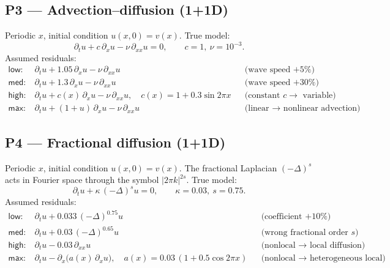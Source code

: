 \documentclass[11pt]{article}
\newcommand{\lap}{\Delta}
\newcommand{\dt}{\partial_t}
\newcommand{\dx}{\partial_x}
\newcommand{\dxx}{\partial_{xx}}
\begin{document}
\subsection*{P3 --- Advection--diffusion (1+1D)}
Periodic $x$, initial condition $u(x,0)=v(x)$.
True model:
\begin{equation}
\dt u + c\,\dx u - \nu\,\dxx u = 0, \qquad c=1,\ \nu=10^{-3}.
\end{equation}
Assumed residuals:
\begin{align*}
\textsf{low:}\ & \dt u + 1.05\,\dx u - \nu\,\dxx u &&\text{(wave speed $+5\%$)}\\
\textsf{med:}\ & \dt u + 1.3\,\dx u - \nu\,\dxx u &&\text{(wave speed $+30\%$)}\\
\textsf{high:}\ & \dt u + c(x)\,\dx u - \nu\,\dxx u,\quad c(x)=1+0.3\sin 2\pi x &&\text{(constant $c\!\to\!$ variable)}\\
\textsf{max:}\ & \dt u + (1+u)\,\dx u - \nu\,\dxx u &&\text{(linear $\to$ nonlinear advection)}
\end{align*}

\subsection*{P4 --- Fractional diffusion (1+1D)}
Periodic $x$, initial condition $u(x,0)=v(x)$. The fractional Laplacian $(-\lap)^{s}$ acts in
Fourier space through the symbol $|2\pi k|^{2s}$.
True model:
\begin{equation}
\dt u + \kappa\,(-\lap)^{s} u = 0, \qquad \kappa=0.03,\ s=0.75 .
\end{equation}
Assumed residuals:
\begin{align*}
\textsf{low:}\ & \dt u + 0.033\,(-\lap)^{0.75} u &&\text{(coefficient $+10\%$)}\\
\textsf{med:}\ & \dt u + 0.03\,(-\lap)^{0.65} u &&\text{(wrong fractional order $s$)}\\
\textsf{high:}\ & \dt u - 0.03\,\dxx u &&\text{(nonlocal $\to$ local diffusion)}\\
\textsf{max:}\ & \dt u - \dx\!\big(a(x)\,\dx u\big),\quad a(x)=0.03\,(1+0.5\cos 2\pi x) &&\text{(nonlocal $\to$ heterogeneous local)}
\end{align*}
\end{document}
